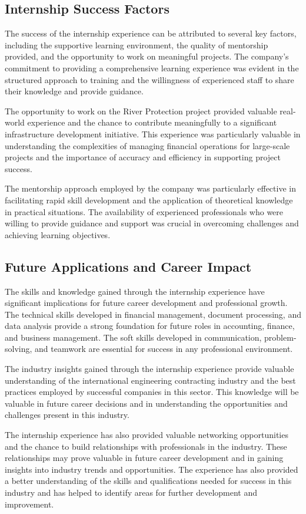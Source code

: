 \subsection{Internship Success Factors}
The success of the internship experience can be attributed to several key factors, including the supportive learning environment, the quality of mentorship provided, and the opportunity to work on meaningful projects. The company's commitment to providing a comprehensive learning experience was evident in the structured approach to training and the willingness of experienced staff to share their knowledge and provide guidance.

The opportunity to work on the River Protection project provided valuable real-world experience and the chance to contribute meaningfully to a significant infrastructure development initiative. This experience was particularly valuable in understanding the complexities of managing financial operations for large-scale projects and the importance of accuracy and efficiency in supporting project success.

The mentorship approach employed by the company was particularly effective in facilitating rapid skill development and the application of theoretical knowledge in practical situations. The availability of experienced professionals who were willing to provide guidance and support was crucial in overcoming challenges and achieving learning objectives.

\subsection{Future Applications and Career Impact}
The skills and knowledge gained through the internship experience have significant implications for future career development and professional growth. The technical skills developed in financial management, document processing, and data analysis provide a strong foundation for future roles in accounting, finance, and business management. The soft skills developed in communication, problem-solving, and teamwork are essential for success in any professional environment.

The industry insights gained through the internship experience provide valuable understanding of the international engineering contracting industry and the best practices employed by successful companies in this sector. This knowledge will be valuable in future career decisions and in understanding the opportunities and challenges present in this industry.

The internship experience has also provided valuable networking opportunities and the chance to build relationships with professionals in the industry. These relationships may prove valuable in future career development and in gaining insights into industry trends and opportunities. The experience has also provided a better understanding of the skills and qualifications needed for success in this industry and has helped to identify areas for further development and improvement.
